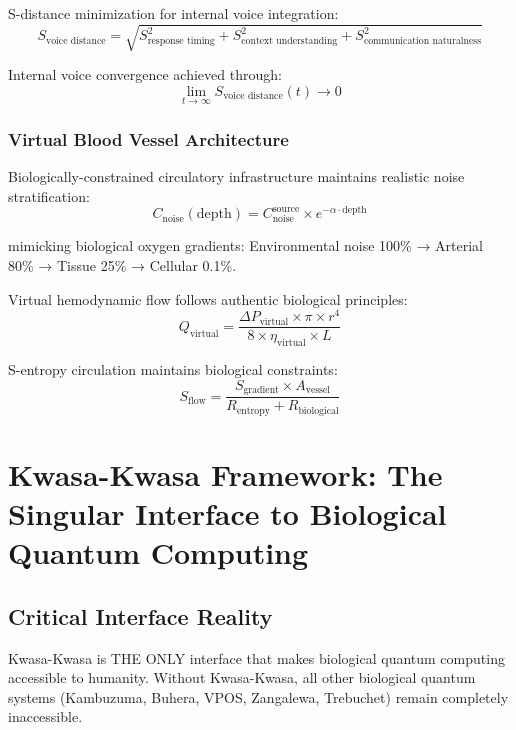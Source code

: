\documentclass[11pt,a4paper]{article}
\begin{document}
S-distance minimization for internal voice integration:
\begin{equation}
S_{\text{voice distance}} = \sqrt{S_{\text{response timing}}^2 + S_{\text{context understanding}}^2 + S_{\text{communication naturalness}}^2}
\end{equation}

Internal voice convergence achieved through:
\begin{equation}
\lim_{t \rightarrow \infty} S_{\text{voice distance}}(t) \rightarrow 0
\end{equation}

\subsubsection{Virtual Blood Vessel Architecture}

Biologically-constrained circulatory infrastructure maintains realistic noise stratification:
\begin{equation}
C_{\text{noise}}(\text{depth}) = C_{\text{noise}}^{\text{source}} \times e^{-\alpha \cdot \text{depth}}
\end{equation}

mimicking biological oxygen gradients: Environmental noise 100\% → Arterial 80\% → Tissue 25\% → Cellular 0.1\%.

Virtual hemodynamic flow follows authentic biological principles:
\begin{equation}
Q_{\text{virtual}} = \frac{\Delta P_{\text{virtual}} \times \pi \times r^4}{8 \times \eta_{\text{virtual}} \times L}
\end{equation}

S-entropy circulation maintains biological constraints:
\begin{equation}
S_{\text{flow}} = \frac{S_{\text{gradient}} \times A_{\text{vessel}}}{R_{\text{entropy}} + R_{\text{biological}}}
\end{equation}

\section{Kwasa-Kwasa Framework: The Singular Interface to Biological Quantum Computing}

\subsection{Critical Interface Reality}

Kwasa-Kwasa is THE ONLY interface that makes biological quantum computing accessible to humanity. Without Kwasa-Kwasa, all other biological quantum systems (Kambuzuma, Buhera, VPOS, Zangalewa, Trebuchet) remain completely inaccessible.
\end{document}
